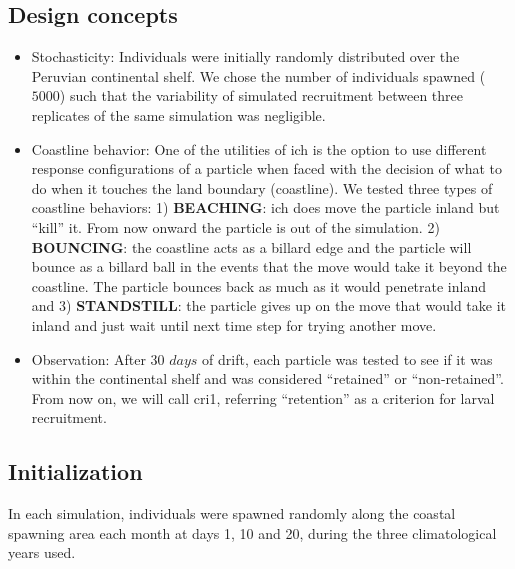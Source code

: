 \subsection{Design concepts}\label{Chap2MethDesi}

\begin{itemize}

\item Stochasticity: Individuals were initially randomly distributed over the Peruvian continental shelf. We chose the number of individuals spawned ($5000$) such that the variability of simulated recruitment between three replicates of the same simulation was negligible.\\

\item Coastline behavior: One of the utilities of \gls{ich} is the option to use different response configurations of a particle when faced with the decision of what to do when it touches the land boundary (coastline). We tested three types of coastline behaviors: 1) \textbf{BEACHING}: \gls{ich} does move the particle inland but ``kill'' it. From now onward the particle is out of the simulation. 2) \textbf{BOUNCING}: the coastline acts as a billard edge and the particle will bounce as a billard ball in the events that the move would take it beyond the coastline. The particle bounces back as much as it would penetrate inland and 3) \textbf{STANDSTILL}: the particle gives up on the move that would take it inland and just wait until next time step for trying another move.\\

\item Observation: After 30 $days$ of drift, each particle was tested to see if it was within the continental shelf and was considered ``retained'' or ``non-retained''. From now on, we will call \gls{cri1}, referring ``retention'' as a criterion for larval recruitment.\\

\end{itemize}

\subsection{Initialization}\label{Chap2MethInit}

In each simulation, individuals were spawned randomly along the coastal spawning area each month at days 1, 10 and 20, during the three climatological years used.\\

